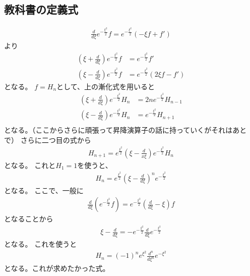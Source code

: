 \documentclass[uplatex]{jsarticle}
\begin{document}
\subsection{教科書の定義式}
\begin{align*}
\frac{d}{d\xi}e^{-\frac{\xi^2}{2}}f=e^{-\frac{\xi^2}{2}}(-\xi f+f')
\end{align*}
より
\begin{align*}
(\xi+\frac{d}{d\xi})e^{-\frac{\xi^2}{2}}f&=e^{-\frac{\xi^2}{2}}f'\\
(\xi-\frac{d}{d\xi})e^{-\frac{\xi^2}{2}}f&=e^{-\frac{\xi^2}{2}}(2\xi f-f')
\end{align*}
となる。
$f=H_n$として、上の漸化式を用いると
\begin{align*}
(\xi+\frac{d}{d\xi})e^{-\frac{\xi^2}{2}}H_n&=2ne^{-\frac{\xi^2}{2}}H_{n-1}\\
(\xi-\frac{d}{d\xi})e^{-\frac{\xi^2}{2}}H_n&=e^{-\frac{\xi^2}{2}}H_{n+1}\\
\end{align*}
となる。（ここからさらに頑張って昇降演算子の話に持っていくがそれはあとで）
さらに二つ目の式から
\begin{align*}
H_{n+1}=e^{\frac{\xi^2}{2}}(\xi-\frac{d}{x\xi})e^{-\frac{\xi^2}{2}}H_n
\end{align*}
となる。
これと$H_1=1$を使うと、
\begin{align*}
H_n=e^{\frac{\xi^2}{2}}(\xi-\frac{d}{d\xi})^ne^{-\frac{\xi^2}{2}}
\end{align*}
となる。
ここで、一般に
\begin{align*}
\frac{d}{d\xi}(e^{-\frac{\xi^2}{2}}f)=e^{-\frac{\xi^2}{2}}(\frac{d}{d\xi}-\xi)f
\end{align*}
となることから
\begin{align*}
\xi-\frac{d}{d\xi}=-e^{-\frac{\xi^2}{2}}\frac{d}{d\xi}e^{-\frac{\xi^2}{2}}
\end{align*}
となる。
これを使うと
\begin{align*}
H_n=(-1)^ne^{\xi^2}\frac{d^n}{d\xi^n}e^{-\xi^2}
\end{align*}
となる。これが求めたかった式。
\end{document}
